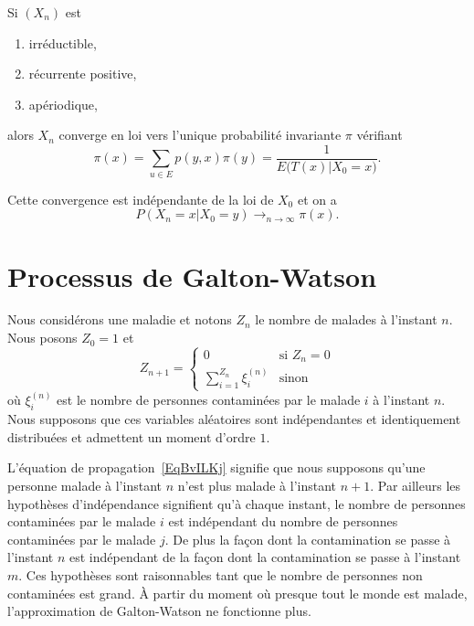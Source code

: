 \begin{theorem}
	Si \( (X_n)\) est
	\begin{enumerate}
		\item
		      irréductible,
		\item
		      récurrente positive,
		\item
		      apériodique,
	\end{enumerate}
	alors \( X_n\) converge en loi vers l'unique probabilité invariante \( \pi\) vérifiant
	\begin{equation}
		\pi(x)=\sum_{u\in E}p(y,x)\pi(y)=\frac{1}{ E\big( T(x)|X_0=x \big) }.
	\end{equation}

	Cette convergence est indépendante de la loi de \( X_0\) et on a
	\begin{equation}
		P(X_n=x|X_0=y)\to_{n\to \infty} \pi(x).
	\end{equation}
\end{theorem}

\section{Processus de Galton-Watson}
\label{SecBPmrPdtGalton}

Nous considérons une maladie et notons \( Z_n\) le nombre de malades à l'instant \( n\). Nous posons \( Z_0=1\) et
\begin{equation}        \label{EqBvILKj}
	Z_{n+1}=\begin{cases}
		0                           & \text{si } Z_n=0 \\
		\sum_{i=1}^{Z_n}\xi_i^{(n)} & \text{sinon}
	\end{cases}
\end{equation}
où \( \xi_i^{(n)}\) est le nombre de personnes contaminées par le malade \(i\) à l'instant \( n\). Nous supposons que ces variables aléatoires sont indépendantes et identiquement distribuées et admettent un moment d'ordre \( 1\).

L'équation de propagation~\ref{EqBvILKj} signifie que nous supposons qu'une personne malade à l'instant \( n\) n'est plus malade à l'instant \( n+1\). Par ailleurs les hypothèses d'indépendance signifient qu'à chaque instant, le nombre de personnes contaminées par le malade \( i\) est indépendant du nombre de personnes contaminées par le malade \( j\). De plus la façon dont la contamination se passe à l'instant \( n\) est indépendant de la façon dont la contamination se passe à l'instant \( m\). Ces hypothèses sont raisonnables tant que le nombre de personnes non contaminées est grand. À partir du moment où presque tout le monde est malade, l'approximation de Galton-Watson ne fonctionne plus.


